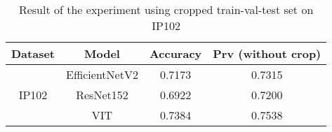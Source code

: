 \begin{table}[!htbp]
\centering
\begin{tabular}{|c|c|c|c|}
\hline
\textbf{Dataset} & \textbf{Model} & \textbf{Accuracy} & \textbf{Prv (without crop)}\\
\hline
\multirow{3}{3em}{IP102} & EfficientNetV2 & 0.7173 & 0.7315\\\cline{2-4}
& ResNet152 & 0.6922 & 0.7200\\\cline{2-4}
& VIT & 0.7384 & 0.7538\\\cline{2-4}
\hline
\end{tabular}
\caption{Result of the experiment using cropped train-val-test set on IP102}
\end{table}
